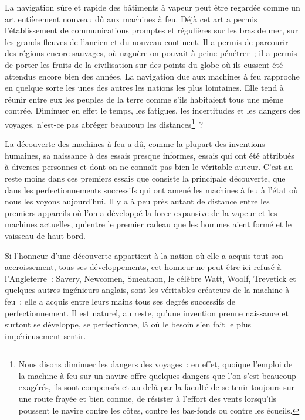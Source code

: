 \documentclass[french,twoside]{book} %
\begin{document}
La navigation sûre et rapide des bâtiments à vapeur peut être regardée comme un art entièrement nouveau dû aux machines à feu. Déjà cet art a permis l’établissement de communications promptes et régulières sur les bras de mer, sur les grands fleuves de l’ancien et du nouveau continent. Il a permis de parcourir des régions encore sauvages, où naguère on pouvait à peine pénétrer ; il a permis de porter les fruits de la civilisation sur des points du globe où ils eussent été attendus encore bien des années. La navigation due aux machines à feu rapproche en quelque sorte les unes des autres les nations les plus lointaines. Elle tend à réunir entre eux les peuples de la terre comme s’ils habitaient tous une même contrée. Diminuer en effet le temps, les fatigues, les incertitudes et les dangers des voyages, n’est-ce pas abréger beaucoup les distances\footnote{Nous disons diminuer les dangers des voyages : en effet, quoique l’emploi de la machine à feu sur un navire offre quelques dangers que l’on s’est beaucoup exagérés, ils sont compensés et au delà par la faculté de se tenir toujours sur une route frayée et bien connue, de résister à l’effort des vents lorsqu’ils poussent le navire contre les côtes, contre les bas-fonds ou contre les écueils.} ?\par
La découverte des machines à feu a dû, comme la plupart des inventions humaines, sa naissance à des essais presque informes, essais qui ont été attribués à diverses personnes et dont on ne connaît pas bien le véritable auteur. C’est au reste moins dans ces premiers essais que consiste la principale découverte, que dans les perfectionnements successifs qui ont amené les machines à feu à l’état où nous les voyons aujourd’hui. Il y a à peu près autant de distance entre les premiers appareils où l’on a développé la force expansive de la vapeur et les machines actuelles, qu’entre le premier radeau que les hommes aient formé et le vaisseau de haut bord.\par
Si l’honneur d’une découverte appartient à la nation où elle a acquis tout son accroissement, tous ses développements, cet honneur ne peut être ici refusé à l’Angleterre : Savery, Newcomen, Smeathon, le célèbre Watt, Woolf, Trevetick et quelques autres ingénieurs anglais, sont les véritables créateurs de la machine à feu ; elle a acquis entre leurs mains tous ses degrés successifs de perfectionnement. Il est naturel, au reste, qu’une invention prenne naissance et surtout se développe, se perfectionne, là où le besoin s’en fait le plus impérieusement sentir.\par
\end{document}
